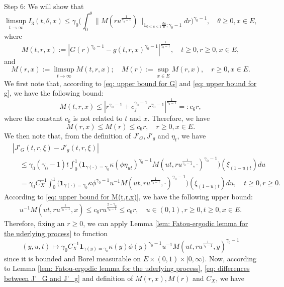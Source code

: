\documentclass[12pt, a4paper]{amsart}
\theoremstyle{definition}
\numberwithin{equation}{section}
\begin{document}
	Step 6: We will show that
\[
	\limsup_{t\to \infty} I_3(t,\theta,x)
	\leq \gamma_0 \Big(  \int_0^\theta  \| M(r u^{\frac{1}{\gamma_0 - 1}}) \|_{\mathbf 1_{0\leq u\leq 1}\frac{du}{u};\gamma_0 - 1}  dr\Big)^{\gamma_0 - 1},
	\quad \theta \geq 0, x\in E,
\]
	where
\[
	M(t,r,x)
	:= |G(r)^{\gamma_0 - 1} - g(t,r,x)^{\gamma_0 - 1}|^{\frac{1}{\gamma_0 - 1}},
	\quad t\geq 0, r\geq 0, x\in E,
\]
	and
\[
	M(r,x)
	:= \limsup_{t\to \infty} M(t,r,x);
	\quad M(r):= \sup_{x\in E} M(r,x),
	\quad r\geq 0, x\in E.
\]
	We first note that, according to \eqref{eq: upper bound for G} and \eqref{eq: upper bound for g}, we have the following bound:
\[\label{eq: upper bound for M(t,r,x)}
	M(t,r,x)
	\leq |r^{\gamma_0 - 1} + c_f^{\gamma_0 - 1} r^{\gamma_0 - 1} | ^{\frac{1}{\gamma_0 - 1}}
	=: c_6 r,
\]
	where the constant $c_6$ is not related to $t$ and $x$.
	Therefore, we have
\[
	M(r,x)
	\leq M(r)
	\leq c_6 r,
	\quad r\geq 0, x\in E.
\]	
	We then note that, from the definition of $J'_G, J'_g$ and $\eta_t$, we have
\[\label{eq: differences between J'_G and J'_g}\begin{split}
	&|J'_G(t,r,\xi) - J'_g(t,r,\xi)|
	\\&\quad \leq \gamma_0(\gamma_0 - 1) t \int_0^1 \big( \mathbf 1_{\gamma(\cdot) = \gamma_0} \kappa (\phi \eta_{ut})^{\gamma_0 - 1} M(ut,ru^{\frac{1}{\gamma_0 - 1}},\cdot)^{\gamma_0 - 1}\big)(\xi_{(1-u)t}) du
	\\&\quad = \gamma_0 C_X^{-1}\int_0^1 \big( \mathbf 1_{\gamma(\cdot) = \gamma_0} \kappa  \phi^{\gamma_0 - 1}  u^{-1} M(ut,ru^{\frac{1}{\gamma_0 - 1}},\cdot)^{\gamma_0 - 1}\big)(\xi_{(1-u)t}) du,
	\quad t\geq 0, r\geq 0.
\end{split}\]
	According to \eqref{eq: upper bound for M(t,r,x)}, we have the following upper bound:
\[\begin{split}
		u^{-1} M(ut,ru^{\frac{1}{\gamma_0 - 1}}, x)
		\leq c_6 ru^{\frac{2-\gamma_0}{\gamma_0 - 1}}
		\leq c_6 r,
		\quad u\in (0,1), r\geq 0, t\geq 0, x\in E.
\end{split}\]
	Therefore, fixing an $r\geq 0$, we can apply Lemma \ref{lem: Fatou-ergodic lemma for the uderlying process} to function
\[
	(y,u,t)
	\mapsto \gamma_0 C_X^{-1}\mathbf 1_{\gamma(y) = \gamma_0} \kappa(y)  \phi(y)^{\gamma_0 - 1}  u^{-1} M(ut,ru^{\frac{1}{\gamma_0 - 1}},y)^{\gamma_0 - 1}
\]
	since it is bounded and Borel measurable on $E\times (0,1) \times [0,\infty)$.
	Now, according to Lemma \ref{lem: Fatou-ergodic lemma for the uderlying process},  \eqref{eq: differences between J'_G and J'_g} and definition of $M(r,x), M(r)$ and $C_X$, we have
\end{document}

